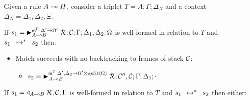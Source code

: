 \begin{lemma}\label{thm:body_match}
   
Given a rule $A \lolli H$, consider a triplet $T = A; \Gamma; \Delta_{N}$ and a
context $\Delta_{N} = \Delta_1, \Delta_2, \Xi$.

If $s_1 = \matstate{A \lolli B}{\rulestk}{\lstack{C}}{\Gamma}{\Delta_1,
   \Delta_2}{\Omega}{\Delta' \rightarrow \Omega'}$
is well-formed in relation to $T$ and $\transs{s_1}{s_2}$ then:

\begin{itemize}[leftmargin=*]
   \item Match succeeds with no backtracking to frames of stack $\lstack{C}$:
   \begin{itemize}[leftmargin=\secondm]
      \item $s_2 = \matstate{A \lolli B}{\rulestk}{\lstack{C''},
         \lstack{C}}{\Gamma}{\Delta_1}{\cdot}{\Delta', \Delta_2 \rightarrow
            \Omega' \otimes split(\Omega)}$
   \end{itemize}

   

\end{itemize}

If $s_1 = \contstate{A \lolli B}{\rulestk}{\lstack{C}}{\Gamma}$ 
is well-formed in relation to $T$ and $\transs{s_1}{s_2}$ then either:

\begin{itemize}[leftmargin=*]
   
\end{itemize}
\end{lemma}

